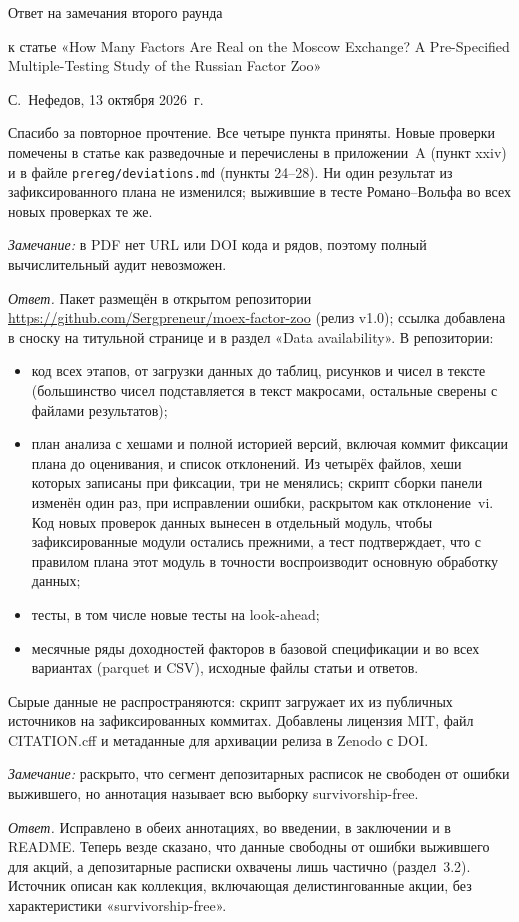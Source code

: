 \documentclass[11pt]{article}
\newcommand{\point}[1]{\par\vspace{10pt}\needspace{6\baselineskip}{\large #1}\par\nopagebreak\vspace{2pt}}
\newcommand{\remark}[1]{\textit{Замечание:} #1\par}
\newcommand{\answer}{\textit{Ответ.} }
\newcommand{\RW}{Романо--Вольфа}
\begin{document}
{\Large Ответ на замечания второго раунда}\par\vspace{4pt}
к статье «How Many Factors Are Real on the Moscow Exchange? A Pre-Specified Multiple-Testing Study of the Russian
Factor Zoo»\par
С.~Нефедов, 13 октября 2026~г.

\vspace{6pt}
Спасибо за повторное прочтение. Все четыре пункта приняты. Новые проверки помечены в статье как разведочные и
перечислены в приложении~A (пункт xxiv) и в файле \texttt{prereg/deviations.md} (пункты 24--28). Ни один результат из
зафиксированного плана не изменился; выжившие в тесте \RW{} во всех новых проверках те же.

\point{1. Ссылка на пакет репликации}
\remark{в PDF нет URL или DOI кода и рядов, поэтому полный вычислительный аудит невозможен.}
\answer Пакет размещён в открытом репозитории
\url{https://github.com/Sergpreneur/moex-factor-zoo} (релиз v1.0); ссылка добавлена в сноску на титульной странице и
в раздел «Data availability». В репозитории:
\begin{itemize}
\item код всех этапов, от загрузки данных до таблиц, рисунков и чисел в тексте (большинство чисел подставляется в текст
макросами, остальные сверены с файлами результатов);
\item план анализа с хешами и полной историей версий, включая коммит фиксации плана до оценивания, и список
отклонений. Из четырёх файлов, хеши которых записаны при фиксации, три не менялись; скрипт сборки панели изменён один
раз, при исправлении ошибки, раскрытом как отклонение~vi. Код новых проверок данных вынесен в отдельный модуль, чтобы
зафиксированные модули остались прежними, а тест подтверждает, что с правилом плана этот модуль в точности
воспроизводит основную обработку данных;
\item тесты, в том числе новые тесты на look-ahead;
\item месячные ряды доходностей факторов в базовой спецификации и во всех вариантах (parquet и CSV), исходные файлы
статьи и ответов.
\end{itemize}
Сырые данные не распространяются: скрипт загружает их из публичных источников на зафиксированных коммитах.
Добавлены лицензия MIT, файл CITATION.cff и метаданные для архивации релиза в Zenodo с DOI.

\point{2. Описание выборки}
\remark{раскрыто, что сегмент депозитарных расписок не свободен от ошибки выжившего, но аннотация называет всю
выборку survivorship-free.}
\answer Исправлено в обеих аннотациях, во введении, в заключении и в README. Теперь везде сказано, что данные
свободны от ошибки выжившего для акций, а депозитарные расписки охвачены лишь частично (раздел~3.2). Источник
описан как коллекция, включающая делистингованные акции, без характеристики «survivorship-free».
\end{document}

